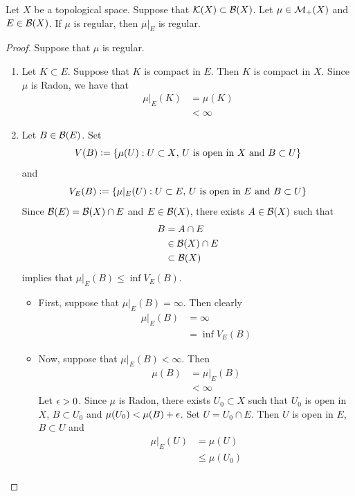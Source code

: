\documentclass{book}
\begin{document}
	\begin{ex} 
		Let $X$ be a topological space. Suppose that $\mathcal{K}(X) \subset \mathcal{B}(X)$. Let $\mu \in \mathcal{M}_+(X)$ and $E \in \mathcal{B}(X)$. If $\mu$ is regular, then $\mu|_E$ is regular.
	\end{ex}

	\begin{proof}
		Suppose that $\mu$ is regular.
		\begin{enumerate}
			\item Let $K \subset E$. Suppose that $K$ is compact in $E$. Then $K$ is compact in $X$. Since $\mu$ is Radon, we have that 
			\begin{align*}
				\mu|_E(K)
				& = \mu(K) \\
				& < \infty
			\end{align*}
			\item Let $B \in \mathcal{B}(E)$. Set 
			$$V(B) \vcentcolon= \{\mu(U): U \subset X \text{, $U$ is open in $X$ and $B \subset U$}\}$$ 
			and 
			$$V_E(B) \vcentcolon= \{\mu|_E(U): U \subset E \text{, $U$ is open in $E$ and $B \subset U$}\}$$
			Since $\mathcal{B}(E) = \mathcal{B}(X) \cap E$ and $E \in \mathcal{B}(X)$, there exists $A \in \mathcal{B}(X)$ such that 
			\begin{align*}
				B 
				& = A \cap E \\
				& \in \mathcal{B}(X) \cap E \\
				& \subset \mathcal{B}(X)
			\end{align*}
			 implies that $\mu|_E(B) \leq \inf V_E(B)$.
			\begin{itemize}
				\item First, suppose that $\mu|_E(B) = \infty$. Then clearly 
				\begin{align*}
					\mu|_E(B)
					& = \infty \\
					& = \inf V_E(B)
				\end{align*}
				\item Now, suppose that $\mu|_E(B) < \infty$. Then 
				\begin{align*}
					\mu(B)
					& = \mu|_E(B) \\
					& < \infty
				\end{align*}
				Let $\epsilon > 0$. Since $\mu$ is Radon, there exists $U_0 \subset X$ such that $U_0$ is open in $X$, $B \subset U_0$ and $\mu(U_0) < \mu(B) + \epsilon$. Set $U = U_0 \cap E$. Then $U$ is open in $E$, $B \subset U$ and 
				\begin{align*}
					\mu|_E(U)
					& = \mu(U) \\
					& \leq \mu(U_0) \\

\end{align*}
\end{itemize}
\end{enumerate}
\end{proof}
\end{document}

